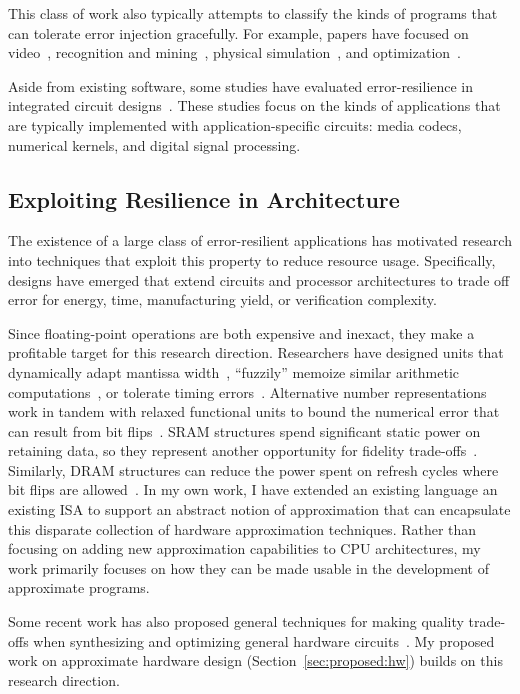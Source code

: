 This class of work also typically attempts to classify the kinds of programs
that can tolerate error injection gracefully. For example, papers have focused
on video~\cite{freton}, recognition and mining~\cite{besteffort}, physical
simulation~\cite{yeh}, and optimization~\cite{hogwild}.

Aside from existing software, some studies have evaluated error-resilience in
integrated circuit designs~\cite{breuer, scalable-effort-hardware}. These
studies focus on the kinds of applications that are typically implemented with
application-specific circuits: media codecs, numerical kernels, and digital
signal processing.


\subsection{Exploiting Resilience in Architecture}

The existence of a large class of error-resilient applications has motivated
research into techniques that exploit this property to reduce resource usage.
Specifically, designs have emerged that extend circuits and processor
architectures to trade off error for energy, time, manufacturing yield, or
verification complexity.

Since floating-point operations are both expensive and inexact, they make a
profitable target for this research direction. Researchers have designed units
that dynamically adapt mantissa width~\cite{bitwidthred}, ``fuzzily'' memoize
similar arithmetic computations~\cite{fuzzymemo}, or tolerate timing
errors~\cite{palem-adders, impact, kumarhpca, hizli, adder-metrics}. Alternative number
representations work in tandem with relaxed functional units to bound the
numerical error that can result from bit flips~\cite{stanleymarbell}. SRAM
structures spend significant static power on retaining data, so they represent
another opportunity for fidelity trade-offs~\cite{hybrid-sram}. Similarly,
DRAM structures can reduce the power spent on refresh cycles where bit flips
are allowed~\cite{flikker}.
In my own work, I have extended an existing language an existing ISA to
support an abstract notion of approximation that can encapsulate this
disparate collection of hardware approximation techniques. Rather than
focusing on adding new approximation capabilities to CPU architectures, my
work primarily focuses on how they can be made usable in the development of
approximate programs.

Some recent work has also proposed general techniques for making quality trade-offs
when synthesizing and optimizing general hardware
circuits~\cite{lossysynthesis, palem-pruning}. My proposed work on approximate
hardware design (Section~\ref{sec:proposed:hw}) builds on this research direction.

